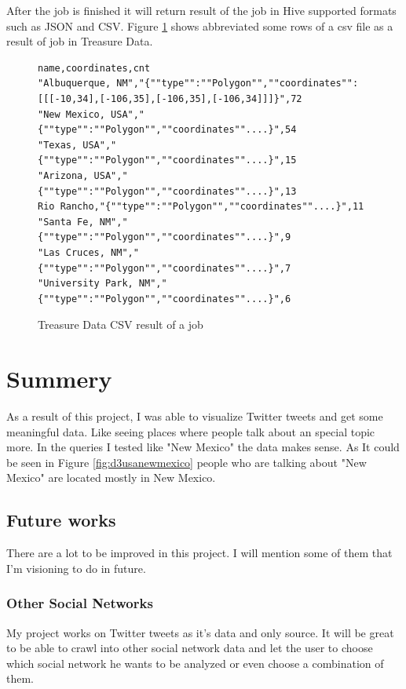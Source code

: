 \documentclass[a4paper,11pt]{report}
\begin{document}
After the job is finished it will return result of the job in Hive supported formats such as JSON and CSV. Figure \ref{fig:tdcsv} shows abbreviated some rows of a csv file as a result of job in Treasure Data.

\begin{figure}[!hbp]
\caption{Treasure Data CSV result of a job}
\begin{lstlisting}
name,coordinates,cnt
"Albuquerque, NM","{""type"":""Polygon"",""coordinates"":[[[-10,34],[-106,35],[-106,35],[-106,34]]]}",72
"New Mexico, USA","{""type"":""Polygon"",""coordinates""....}",54
"Texas, USA","{""type"":""Polygon"",""coordinates""....}",15
"Arizona, USA","{""type"":""Polygon"",""coordinates""....}",13
Rio Rancho,"{""type"":""Polygon"",""coordinates""....}",11
"Santa Fe, NM","{""type"":""Polygon"",""coordinates""....}",9
"Las Cruces, NM","{""type"":""Polygon"",""coordinates""....}",7
"University Park, NM","{""type"":""Polygon"",""coordinates""....}",6
\end{lstlisting}
\label{fig:tdcsv}
\end{figure}

\chapter{Summery}

As a result of this project, I was able to visualize Twitter tweets and get some meaningful data. Like seeing places where people talk about an special topic more. In the queries I tested like "New Mexico" the data makes sense. As It could be seen in Figure \ref{fig:d3usanewmexico} people who are talking about "New Mexico" are located mostly in New Mexico.

\section{Future works}

There are a lot to be improved in this project. I will mention some of them that I'm visioning to do in future.

\subsection{Other Social Networks}

My project works on Twitter tweets as it's data and only source. It will be great to be able to crawl into other social network data and let the user to choose which social network he wants to be analyzed or even choose a combination of them.
\end{document}
